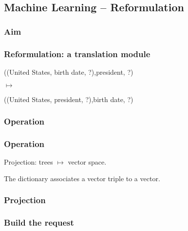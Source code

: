 \subsection{Machine Learning \--- Reformulation}

\subsubsection{Aim}

\begin{frame}
\frametitle{Reformulation: a translation module}
((United States, birth date, ?),president, ?)

$\mapsto$

((United States, president, ?),birth date, ?)

\end{frame}

\subsubsection{Operation}
\begin{frame}
\frametitle{Operation}
\alert{Projection:} trees $\mapsto$ vector space.

The dictionary associates a vector triple to a vector.
\end{frame}

\begin{frame}
\frametitle{Projection}
\begin{center}
\end{center}
\end{frame}

\subsubsection{Build the request}

